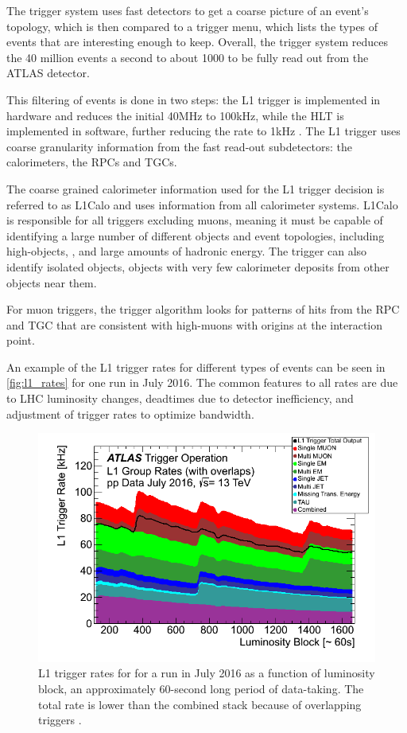The trigger system uses fast detectors to get a coarse picture of an event's topology, which is then compared to a trigger menu, which lists the types of events that are interesting enough to keep. Overall, the trigger system reduces the 40 million events a second to about 1000 to be fully read out from the \ac{ATLAS} detector. 

This filtering of events is done in two steps: the \ac{L1} trigger is implemented in hardware and reduces the initial 40MHz to 100kHz, while the \ac{HLT} is implemented in software, further reducing the rate to 1kHz \cite{ATL-DAQ-PUB-2016-001}. The \ac{L1} trigger uses coarse granularity information from the fast read-out subdetectors: the calorimeters, the \acp{RPC} and \acp{TGC}. 

The coarse grained calorimeter information used for the \ac{L1} trigger decision is referred to as \ac{L1Calo} and uses information from all calorimeter systems. \ac{L1Calo} is responsible for all triggers excluding muons, meaning it must be capable of identifying a large number of different objects and event topologies, including high-\pt objects, \met, and large amounts of hadronic energy. The trigger can also identify isolated objects, objects with very few calorimeter deposits from other objects near them.

For muon triggers, the trigger algorithm looks for patterns of hits from the \ac{RPC} and \ac{TGC} that are consistent with high-\pt muons with origins at the interaction point. 

An example of the \ac{L1} trigger rates for different types of events can be seen in \autoref{fig:l1_rates} for one run in July 2016. The common features to all rates are due to \ac{LHC} luminosity changes, deadtimes due to detector inefficiency, and adjustment of trigger rates to optimize bandwidth.

\begin{centering}
\begin{figure}[!hbt]
\myfloatalign
\includegraphics[width=.90\linewidth]{figures/atlas/Time_L1GroupRate_Stack_2016_07.png}
\caption{\ac{L1} trigger rates for for a run in July 2016 as a function of luminosity block, an approximately 60-second long period of data-taking. The total rate is lower than the combined stack because of overlapping triggers \cite{trigger}.}
\label{fig:l1_rates}
\end{figure}
\end{centering}

